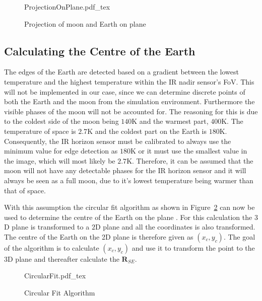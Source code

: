 \begin{figure}[!hbt]
	\centering
	\def\svgwidth{14cm}
	{ProjectionOnPlane.pdf_tex}
	\caption{Projection of moon and Earth on plane}
	\label{fig:ProjectionOnPlane}
\end{figure}

\subsection{Calculating the Centre of the Earth}
\label{section: Calculating the Centre of the Earth}
The edges of the Earth are detected based on a gradient between the lowest temperature and the highest temperature within the IR nadir sensor's FoV. This will not be implemented in our case, since we can determine discrete points of both the Earth and the moon from the simulation environment. Furthermore the visible phases of the moon will not be accounted for. The reasoning for this is due to the coldest side of the moon being $140$K and the warmest part, $400$K. The temperature of space is $\num{2.7}$K and the coldest part on the Earth is $180$K. Consequently, the IR horizon sensor must be calibrated to always use the minimum value for edge detection as $180$K or it must use the smallest value in the image, which will most likely be $2.7$K. Therefore, it can be assumed that the moon will not have any detectable phases for the IR horizon sensor and it will always be seen as a full moon, due to it's lowest temperature being warmer than that of space. 

With this assumption the circular fit algorithm as shown in Figure~\ref{fig:CircularFit} can now be used to determine the centre of the Earth on the plane \cite{wessels2018infrared}. For this calculation the $3$D plane is transformed to a $2$D plane and all the coordinates is also transformed. The centre of the Earth on the 2D plane is therefore given as $\left(x_c, y_c\right)$. The goal of the algorithm is to calculate $\left(x_c, y_c\right)$ and use it to transform the point to the 3D plane and thereafter calculate the $\mathbf{R}_{SE}$.

\begin{figure}[!hbt]
	\centering
	\def\svgwidth{14cm}
	{CircularFit.pdf_tex}
	\caption{Circular Fit Algorithm}
	\label{fig:CircularFit}
\end{figure}

